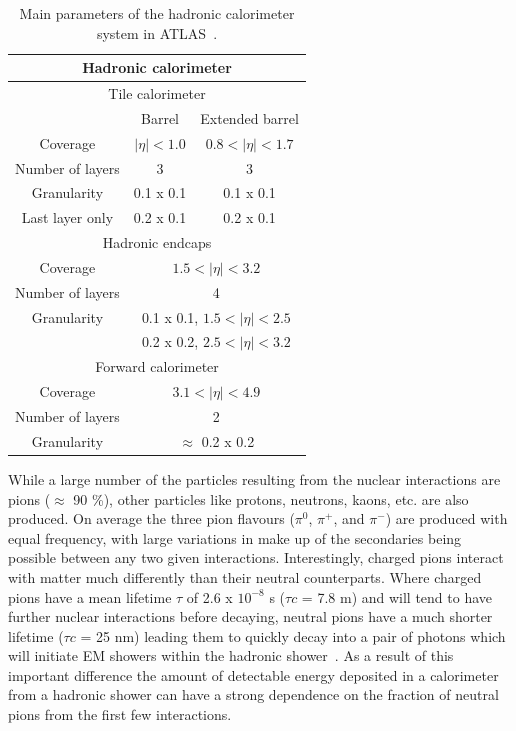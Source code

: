\begin{table}
  \centering
  \begin{tabular}{ |c|c|c|}
  \hline
  \multicolumn{3}{|c|}{\textbf{Hadronic calorimeter}} \\
  \hline
  \hline
  \multicolumn{3}{|c|}{Tile calorimeter} \\
  \hline 
                     & Barrel                                   & Extended barrel \\
  Coverage           & $\mid\eta\mid<1.0$                       & $0.8<\mid\eta\mid<1.7$ \\
  \hline 
  Number of layers   & 3                                        & 3 \\
  \hline 
  Granularity        & 0.1 x 0.1				& 0.1 x 0.1 \\
  Last layer only    & 0.2 x 0.1				& 0.2 x 0.1 \\
  \hline 
  \hline
  \multicolumn{3}{|c|}{Hadronic endcaps} \\
  \hline 
  Coverage           & 	\multicolumn{2}{|c|}{$1.5<\mid\eta\mid<3.2$} \\
  \hline
  Number of layers   &  \multicolumn{2}{|c|}{ 4} \\
  \hline
  Granularity        & 	\multicolumn{2}{|c|}{0.1 x 0.1, $1.5<\mid\eta\mid<2.5$} \\
  		     &  \multicolumn{2}{|c|}{ 0.2 x 0.2, $2.5<\mid\eta\mid<3.2$} \\
  \hline
  \hline
  \multicolumn{3}{|c|}{Forward calorimeter} \\
  \hline
  Coverage	     & \multicolumn{2}{|c|}{$3.1<\mid\eta\mid<4.9$} \\
  \hline
  Number of layers   & \multicolumn{2}{|c|}{2} \\
  \hline
  Granularity        & \multicolumn{2}{|c|}{$\approx$ 0.2 x 0.2} \\
  \hline
  \end{tabular}
  \caption[Main parameters of the hadronic calorimeter system. ]
        {\small Main parameters of the hadronic calorimeter system in ATLAS~\cite{JOIATLAS}. }
\label{table:HadCalo}
\end{table}

While a large number of the particles resulting from the nuclear interactions are pions ($\approx$ 90 \%), other particles like protons, neutrons, kaons, etc. are also produced.  
On average the three pion flavours ($\pi^0$, $\pi^{+}$, and $\pi^{-}$) are produced with equal frequency, with large variations in make up of the secondaries being possible between any two given interactions.  
Interestingly, charged pions interact with matter much differently than their neutral counterparts.  
Where charged pions have a mean lifetime $\tau$ of 2.6 x $10^{-8}$ s ($\tau c$ = 7.8 m) and will tend to have further nuclear interactions before decaying, neutral pions have a much shorter lifetime ($\tau c$ = 25 nm) leading them to quickly decay into a pair of photons which will initiate EM showers within the hadronic shower~\cite{PDG}.  
As a result of this important difference the amount of detectable energy deposited in a calorimeter from a hadronic shower can have a strong dependence on the fraction of neutral pions from the first few interactions.  

